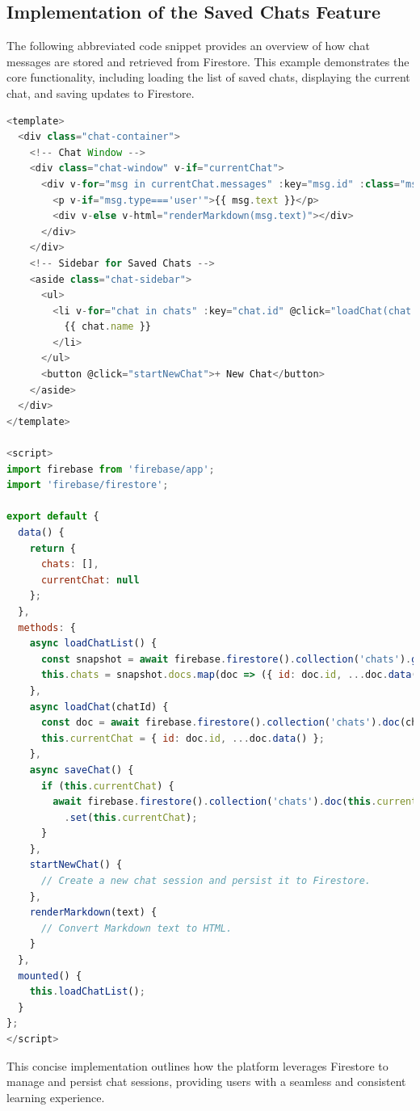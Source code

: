 \subsection{Implementation of the Saved Chats Feature}

The following abbreviated code snippet provides an overview of how chat messages are stored and retrieved from Firestore. This example demonstrates the core functionality, including loading the list of saved chats, displaying the current chat, and saving updates to Firestore.

\begin{lstlisting}[language=JavaScript, caption={Abbreviated Implementation of the Saved Chats Feature}, frame=single]
<template>
  <div class="chat-container">
    <!-- Chat Window -->
    <div class="chat-window" v-if="currentChat">
      <div v-for="msg in currentChat.messages" :key="msg.id" :class="msg.type">
        <p v-if="msg.type==='user'">{{ msg.text }}</p>
        <div v-else v-html="renderMarkdown(msg.text)"></div>
      </div>
    </div>
    <!-- Sidebar for Saved Chats -->
    <aside class="chat-sidebar">
      <ul>
        <li v-for="chat in chats" :key="chat.id" @click="loadChat(chat.id)">
          {{ chat.name }}
        </li>
      </ul>
      <button @click="startNewChat">+ New Chat</button>
    </aside>
  </div>
</template>

<script>
import firebase from 'firebase/app';
import 'firebase/firestore';

export default {
  data() {
    return {
      chats: [],
      currentChat: null
    };
  },
  methods: {
    async loadChatList() {
      const snapshot = await firebase.firestore().collection('chats').get();
      this.chats = snapshot.docs.map(doc => ({ id: doc.id, ...doc.data() }));
    },
    async loadChat(chatId) {
      const doc = await firebase.firestore().collection('chats').doc(chatId).get();
      this.currentChat = { id: doc.id, ...doc.data() };
    },
    async saveChat() {
      if (this.currentChat) {
        await firebase.firestore().collection('chats').doc(this.currentChat.id)
          .set(this.currentChat);
      }
    },
    startNewChat() {
      // Create a new chat session and persist it to Firestore.
    },
    renderMarkdown(text) {
      // Convert Markdown text to HTML.
    }
  },
  mounted() {
    this.loadChatList();
  }
};
</script>
\end{lstlisting}

This concise implementation outlines how the platform leverages Firestore to manage and persist chat sessions, providing users with a seamless and consistent learning experience.

